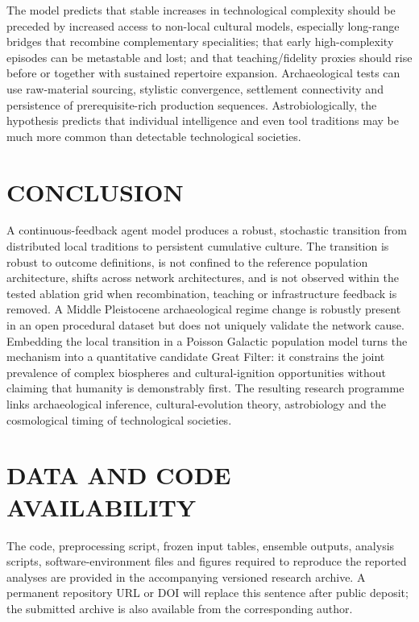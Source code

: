 \documentclass{article_saj}
\begin{document}
The model predicts that stable increases in technological complexity should be preceded by increased access to non-local cultural models, especially long-range bridges that recombine complementary specialities; that early high-complexity episodes can be metastable and lost; and that teaching/fidelity proxies should rise before or together with sustained repertoire expansion. Archaeological tests can use raw-material sourcing, stylistic convergence, settlement connectivity and persistence of prerequisite-rich production sequences. Astrobiologically, the hypothesis predicts that individual intelligence and even tool traditions may be much more common than detectable technological societies.

\section{CONCLUSION}

A continuous-feedback agent model produces a robust, stochastic transition from distributed local traditions to persistent cumulative culture. The transition is robust to outcome definitions, is not confined to the reference population architecture, shifts across network architectures, and is not observed within the tested ablation grid when recombination, teaching or infrastructure feedback is removed. A Middle Pleistocene archaeological regime change is robustly present in an open procedural dataset but does not uniquely validate the network cause. Embedding the local transition in a Poisson Galactic population model turns the mechanism into a quantitative candidate Great Filter: it constrains the joint prevalence of complex biospheres and cultural-ignition opportunities without claiming that humanity is demonstrably first. The resulting research programme links archaeological inference, cultural-evolution theory, astrobiology and the cosmological timing of technological societies.


\section*{DATA AND CODE AVAILABILITY}
The code, preprocessing script, frozen input tables, ensemble outputs, analysis scripts, software-environment files and figures required to reproduce the reported analyses are provided in the accompanying versioned research archive. A permanent repository URL or DOI will replace this sentence after public deposit; the submitted archive is also available from the corresponding author.
\end{document}
